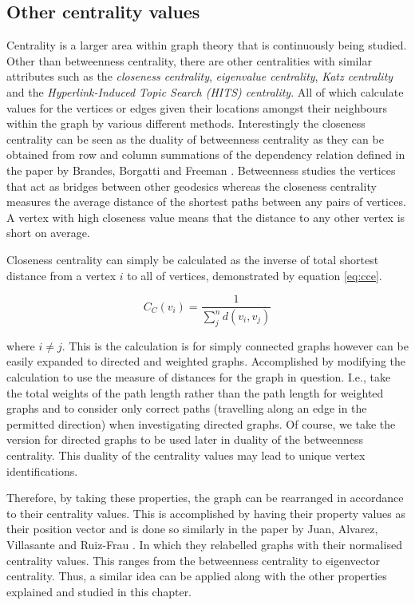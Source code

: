 \subsection{Other centrality values}
Centrality is a larger area within graph theory that is continuously being studied. Other than betweenness centrality, there are other centralities with similar attributes such as the \emph{closeness centrality}, \emph{eigenvalue centrality}, \emph{Katz centrality} \cite{katz1953new} and the \emph{Hyperlink-Induced Topic Search (HITS) centrality}. All of which calculate values for the vertices or edges given their locations amongst their neighbours within the graph by various different methods. Interestingly the closeness centrality can be seen as the duality of betweenness centrality as they can be obtained from row and column summations of the dependency relation defined in the paper by Brandes, Borgatti and Freeman \cite{brandes2016maintaining}.
Betweenness studies the vertices that act as bridges between other geodesics whereas the closeness centrality measures the average distance of the shortest paths between any pairs of vertices. A vertex with high closeness value means that the distance to any other vertex is short on average. 

Closeness centrality \cite{brandes2007centrality} can simply be calculated as the inverse of total shortest distance from a vertex $i$ to all of vertices, demonstrated by equation \ref{eq:cce}.

\begin{equation}\label{eq:cce}
C_C(v_i) = \frac{1}{\sum_{j}^nd(v_i, v_j)}
\end{equation}

where $i \ne j$. This is the calculation is for simply connected graphs however can be easily expanded to directed and weighted graphs. Accomplished by modifying the calculation to use the measure of distances for the graph in question. I.e., take the total weights of the path length rather than the path length for weighted graphs and to consider only correct paths (travelling along an edge in the permitted direction) when investigating directed graphs. Of course, we take the version for directed graphs to be used later in duality of the betweenness centrality. This duality of the centrality values may lead to unique vertex identifications.
\newline

Therefore, by taking these properties, the graph can be rearranged in accordance to their centrality values. This is accomplished by having their property values as their position vector and is done so similarly in the paper by Juan, Alvarez, Villasante and Ruiz-Frau \cite{de2021graph}. In which they relabelled graphs with their normalised centrality values. This ranges from the betweenness centrality to eigenvector centrality. Thus, a similar idea can be applied along with the other properties explained and studied in this chapter.

